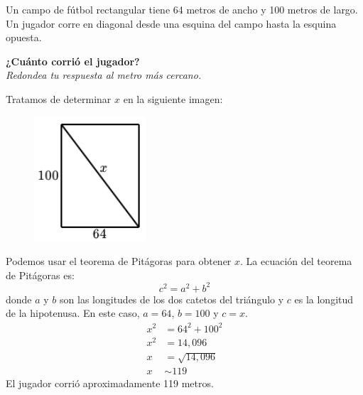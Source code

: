 Un campo de fútbol rectangular tiene 64 metros de ancho y 100 metros de largo.
Un jugador corre en diagonal desde una esquina del campo hasta la esquina opuesta.

\textbf{¿Cuánto corrió el jugador?}\\
\textit{Redondea tu respuesta al metro más cercano.}


\begin{solutionbox}{15cm}
    Tratamos de determinar $x$ en la siguiente imagen:
    \begin{figure}[H]
        \centering
        \includegraphics[width=0.2\linewidth]{../images/proverb_pitagoras_12.png}
        \caption{}
        \label{fig:proverb_pitagoras_12}
    \end{figure}
    Podemos usar el teorema de Pitágoras para obtener $x$.
    La ecuación del teorema de Pitágoras es:
    \[c^2=a^2+b^2\]
    donde $a$ y $b$ son las longitudes de los dos catetos del triángulo y $c$ es la longitud de la hipotenusa.
    En este caso, $a=64$, $b=100$ y $c=x$.
    \begin{align*}
        x^2 & =64^2+100^2    \\
        x^2 & = 14,096       \\
        x   & =\sqrt{14,096} \\
        x   & \sim 119
    \end{align*}
    El jugador corrió aproximadamente 119 metros.
\end{solutionbox}